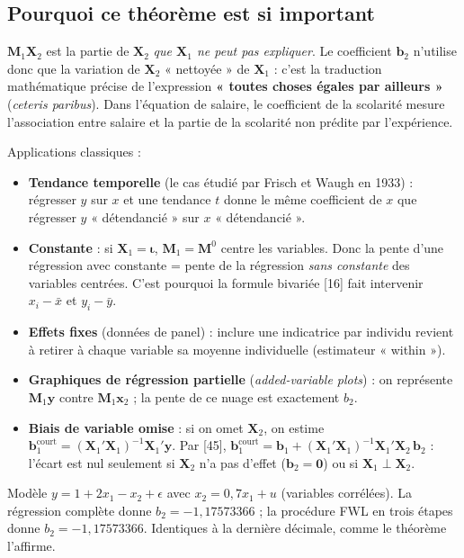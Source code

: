 \documentclass[11pt,a4paper]{article}
\newcommand{\vy}{\mathbf{y}}
\newcommand{\vX}{\mathbf{X}}
\newcommand{\vb}{\mathbf{b}}
\newcommand{\vx}{\mathbf{x}}
\newcommand{\vi}{\bm{\iota}}
\newcommand{\Mm}{\mathbf{M}}
\begin{document}
\subsection{Pourquoi ce théorème est si important}
\begin{intuition}
$\Mm_1\vX_2$ est la partie de $\vX_2$ \emph{que $\vX_1$ ne peut pas expliquer}. Le coefficient $\vb_2$ n'utilise donc que la variation de $\vX_2$ « nettoyée » de $\vX_1$ : c'est la traduction mathématique précise de l'expression \textbf{« toutes choses égales par ailleurs »} (\emph{ceteris paribus}). Dans l'équation de salaire, le coefficient de la scolarité mesure l'association entre salaire et la partie de la scolarité non prédite par l'expérience.
\end{intuition}

Applications classiques :
\begin{itemize}
\item \textbf{Tendance temporelle} (le cas étudié par Frisch et Waugh en 1933) : régresser $y$ sur $x$ et une tendance $t$ donne le même coefficient de $x$ que régresser $y$ « détendancié » sur $x$ « détendancié ».
\item \textbf{Constante} : si $\vX_1=\vi$, $\Mm_1=\Mm^0$ centre les variables. Donc la pente d'une régression avec constante = pente de la régression \emph{sans constante} des variables centrées. C'est pourquoi la formule bivariée [16] fait intervenir $x_i-\bar x$ et $y_i-\bar y$.
\item \textbf{Effets fixes} (données de panel) : inclure une indicatrice par individu revient à retirer à chaque variable sa moyenne individuelle (estimateur « within »).
\item \textbf{Graphiques de régression partielle} (\emph{added-variable plots}) : on représente $\Mm_1\vy$ contre $\Mm_1\vx_2$ ; la pente de ce nuage est exactement $b_2$.
\item \textbf{Biais de variable omise} : si on omet $\vX_2$, on estime $\vb_1^{\text{court}}=(\vX_1'\vX_1)^{-1}\vX_1'\vy$. Par [45], $\vb_1^{\text{court}}=\vb_1+(\vX_1'\vX_1)^{-1}\vX_1'\vX_2\,\vb_2$ : l'écart est nul seulement si $\vX_2$ n'a pas d'effet ($\vb_2=\mathbf 0$) ou si $\vX_1\perp\vX_2$.
\end{itemize}

\begin{exemple}[title={Vérification numérique (simulation, $n=200$)}]
Modèle $y=1+2x_1-x_2+\epsilon$ avec $x_2=0{,}7x_1+u$ (variables corrélées). La régression complète donne $b_2=-1{,}17573366$ ; la procédure FWL en trois étapes donne $b_2=-1{,}17573366$. Identiques à la dernière décimale, comme le théorème l'affirme.
\end{exemple}
\end{document}
